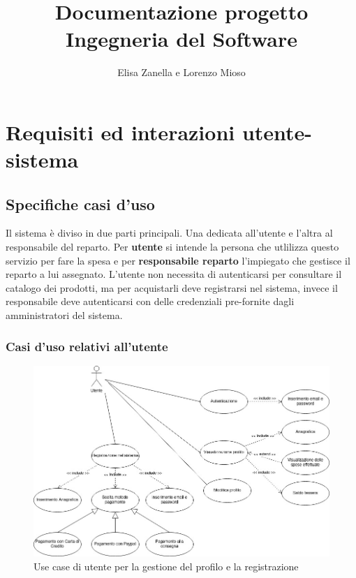 \documentclass{article}
\author{Elisa Zanella e Lorenzo Mioso}
\title{Documentazione progetto Ingegneria del Software}
\begin{document}
\maketitle

\newpage

\tableofcontents

\newpage

\listoffigures

\newpage

\section{Requisiti ed interazioni utente-sistema}

\subsection{Specifiche casi d’uso}

Il sistema è diviso in due parti principali. Una dedicata all'utente e l'altra
al responsabile del reparto. Per \textbf{utente} si intende la persona che utlilizza questo
servizio per fare la spesa e per \textbf{responsabile reparto} l'impiegato che gestisce
il reparto a lui assegnato. L’utente non necessita di autenticarsi per consultare il
catalogo dei prodotti, ma per acquistarli deve registrarsi nel sistema, invece il
responsabile deve autenticarsi con delle credenziali pre-fornite dagli amministratori
del sistema.

\subsubsection{Casi d'uso relativi all'utente}

\begin{figure}[h!]
	\centering
	\includegraphics[width=\textwidth]{UseCaseUtenteGestioneProfilo.jpg}
	\caption{Use case di utente per la gestione del profilo e la registrazione}
	\label{fig:UseCaseUtenteGestioneProfilo}
\end{figure}
\end{document}
